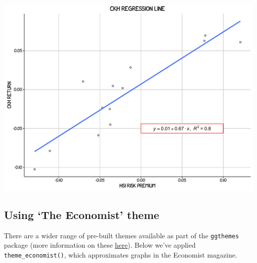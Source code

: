 \begin{center}\includegraphics[width=0.55\linewidth]{figures/lr_15-1} \end{center}

\subsection{\texorpdfstring{Using `The Economist'
theme}{Using The Economist theme}}\label{using-the-economist-theme-10}

There are a wider range of pre-built themes available as part of the
\texttt{ggthemes} package (more information on these
\href{https://cran.r-project.org/web/packages/ggthemes/vignettes/ggthemes.html}{here}).
Below we've applied \texttt{theme\_economist()}, which approximates
graphs in the Economist magazine.

